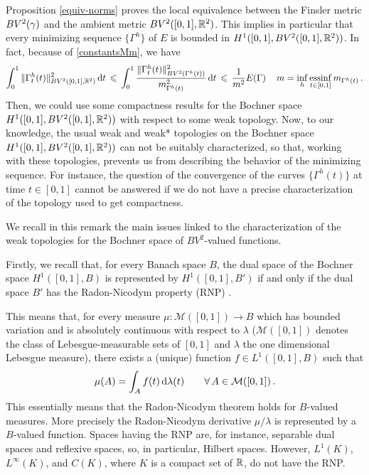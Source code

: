 \begin{rem}\label{topology-bochner}
Proposition \eqref{equiv-norms} proves the local equivalence between the Finsler metric $BV^2(\gamma)$ and the ambient metric $BV^2([0,1], \mathbb{R}^2)$. This implies in particular that every minimizing sequence $\{\Gamma^h\}$ of $E$ is bounded in $H^1([0,1],BV^2([0,1],\mathbb{R}^2))$. In fact, because of \eqref{constantsMm}, we have
$$
\int_0^1 \|\Gamma_t^h(t)\|^2_{BV^2([0,1],\mathbb{R}^2)}\,\mathrm{d} t\,\leqslant \,\int_0^1 \frac{\|\Gamma_t^h(t)\|^2_{BV^2(\Gamma^h(t))}}{m_{\Gamma^h(t)}^2} \,\mathrm{d} t \,\leqslant \, \frac{1}{m^2}E(\Gamma)\, \quad m=\underset{h}{\inf}\,\underset{t\in [0,1]}{\rm{essinf}}\,m_{\Gamma^h(t)}\,.
$$
Then, we could  use some compactness results for the Bochner space $H^1([0,1],BV^2([0,1],\mathbb{R}^2))$ with respect to some weak topology. 
Now, to our knowledge, the usual  weak and weak* topologies on the Bochner space $H^1([0,1],BV^2([0,1],\mathbb{R}^2))$ can not be suitably characterized, so that, working with these topologies, prevents us from describing the behavior of the minimizing sequence. 
For instance, the question of the convergence of the curves $\{\Gamma^h(t)\}$ at time $t\in [0,1]$ cannot be answered if we do not have a precise characterization of the topology used to get  compactness. 

We recall in this remark the main issues linked to the characterization of the weak topologies for the Bochner space of $BV^2$-valued functions.

Firstly, we recall that, for every Banach space $B$, the dual space of the Bochner space $H^1([0,1],B)$  is represented by $H^1([0,1],B')$ if and only if the dual space $B'$ has the Radon-Nicodym property (RNP) \cite{Bochner_dual, Bochner_dual_2}. 

This means that, for every measure $\mu: \mathcal{M}([0,1])\rightarrow B$ which has bounded variation and is absolutely continuous with respect to $\lambda$ ($\mathcal{M}([0,1])$ denotes the class of Lebesgue-measurable sets of $[0,1]$ and $\lambda$ the one dimensional Lebesgue measure),  there exists a (unique) function $f\in L^1([0,1], B)$ such that 
\begin{equation}\label{rnp}\mu(A)=\int_A f(t) \,\mathrm{d} \lambda(t) \quad \quad \forall\, A\in \mathcal{M}([0,1])\,.
\end{equation}
This essentially means that the Radon-Nicodym theorem holds for $B$-valued measures. More precisely the Radon-Nicodym derivative $\mu/\lambda$ is represented by a $B$-valued function.
Spaces having the RNP are, for instance,  separable dual spaces and reflexive spaces, so, in particular, Hilbert spaces. However, $L^1(K)$, $L^\infty(K)$, and $C(K)$, where $K$ is a compact set of $\mathbb{R}$, do not have the RNP.



\end{rem}
